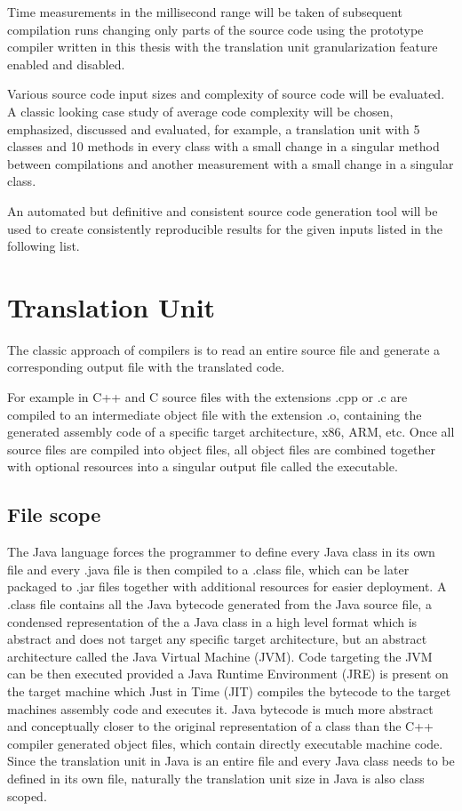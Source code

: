 \documentclass{VUMIFPSbakalaurinis}
\begin{document}
Time measurements in the millisecond range will be taken of subsequent compilation runs changing only parts of the source code using the prototype compiler written in this thesis with the translation unit granularization feature enabled and disabled.

Various source code input sizes and complexity of source code will be evaluated.
A classic looking case study of average code complexity will be chosen, emphasized, discussed and evaluated, for example, a translation unit with 5 classes and 10 methods in every class with a small change in a singular method between compilations and another measurement with a small change in a singular class.

An automated but definitive and consistent source code generation tool will be used to create consistently reproducible results for the given inputs listed in the following list.

\section{Translation Unit}
The classic approach of compilers is to read an entire source file and generate a corresponding output file with the translated code.

For example in C++ and C source files with the extensions .cpp or .c are compiled to an intermediate object file with the extension .o, containing the generated assembly code of a specific target architecture, x86, ARM, etc.
Once all source files are compiled into object files, all object files are combined together with optional resources into a singular output file called the executable.


\subsection{File scope}
The Java language forces the programmer to define every Java class in its own file and every .java file is then compiled to a .class file, which can be later packaged to .jar files together with additional resources for easier deployment.
A .class file contains all the Java bytecode generated from the Java source file, a condensed representation of the a Java class in a high level format which is abstract and does not target any specific target architecture, but an abstract architecture called the Java Virtual Machine (JVM).
Code targeting the JVM can be then executed provided a Java Runtime Environment (JRE) is present on the target machine which Just in Time (JIT) compiles the bytecode to the target machines assembly code and executes it.
Java bytecode is much more abstract and conceptually closer to the original representation of a class than the C++ compiler generated object files, which contain directly executable machine code.
Since the translation unit in Java is an entire file and every Java class needs to be defined in its own file, naturally the translation unit size in Java is also class scoped.
\end{document}
